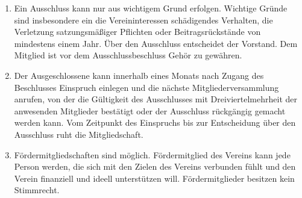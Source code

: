 \documentclass[12pt,a4paper]{article}
\begin{document}
\begin{enumerate}
\item Ein Ausschluss kann nur aus wichtigem Grund erfolgen. Wichtige Gründe sind insbesondere ein die Vereininteressen schädigendes Verhalten, die Verletzung satzungsmäßiger Pflichten oder Beitragsrückstände von mindestens einem Jahr. Über den Ausschluss entscheidet der Vorstand. Dem Mitglied ist vor dem Ausschlussbeschluss Gehör zu gewähren.
\item Der Ausgeschlossene kann innerhalb eines Monats nach Zugang des Beschlusses Einspruch einlegen und die nächste Mitgliederversammlung anrufen, von der die Gültigkeit des Ausschlusses mit Dreiviertelmehrheit der anwesenden Mitglieder bestätigt oder der Ausschluss rückgängig gemacht werden kann. Vom Zeitpunkt des Einspruchs bis zur Entscheidung über den Ausschluss ruht die Mitgliedschaft.
\item Fördermitgliedschaften sind möglich. Fördermitglied des Vereins kann jede Person werden, die sich mit den Zielen des Vereins verbunden fühlt und den Verein finanziell und ideell unterstützen will. Fördermitglieder besitzen kein Stimmrecht.
\end{enumerate}
\end{document}
